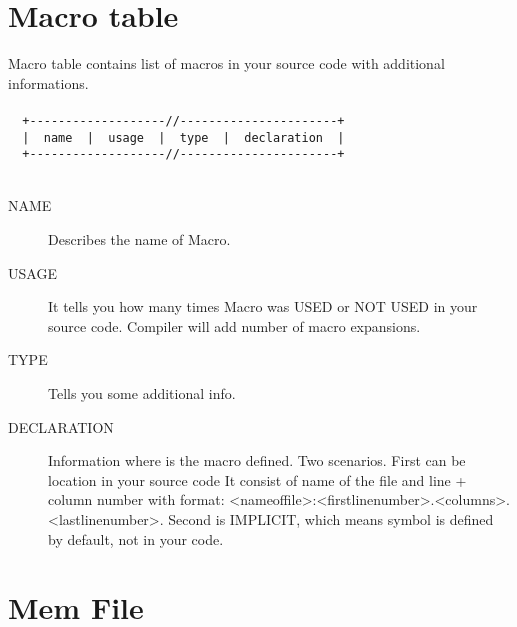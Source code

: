         \section{Macro table}
            Macro table contains list of macros in your source code with additional informations.
            {
                ~\\
                \usecodefont\\
                \verb'  +-------------------//----------------------+'\\
                \verb'  |  name  |  usage  |  type  |  declaration  |'\\
                \verb'  +-------------------//----------------------+'\\
            }\\
            \begin{description}
             \item[NAME] Describes the name of Macro.
             \item[USAGE] It tells you how many times Macro was USED or NOT USED in your source code. Compiler will add number of macro expansions.
             \item[TYPE] Tells you some additional info.
             \item[DECLARATION] Information where is the macro defined. Two scenarios. First can be location in your source code
             It consist of name of the file and line + column number with format: <nameoffile>:<firstlinenumber>.<columns>.<lastlinenumber>.
             Second is IMPLICIT, which means symbol is defined by default, not in your code.
            \end{description}
            
        \section{Mem File}
